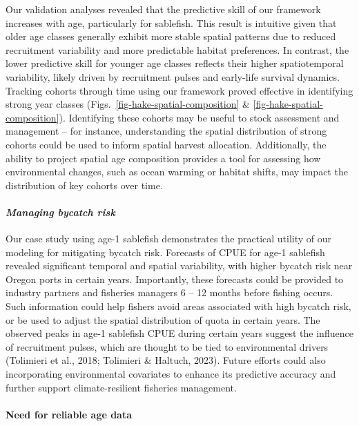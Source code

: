 \documentclass[
]{article}
\let\oldparagraph\paragraph
\renewcommand{\paragraph}[1]{\oldparagraph{#1}\mbox{}}
\begin{document}
Our validation analyses revealed that the predictive skill of our
framework increases with age, particularly for sablefish. This result is
intuitive given that older age classes generally exhibit more stable
spatial patterns due to reduced recruitment variability and more
predictable habitat preferences. In contrast, the lower predictive skill
for younger age classes reflects their higher spatiotemporal
variability, likely driven by recruitment pulses and early-life survival
dynamics. Tracking cohorts through time using our framework proved
effective in identifying strong year classes
(Figs.~\ref{fig-hake-spatial-composition} \&
\ref{fig-hake-spatial-composition}). Identifying these cohorts may be
useful to stock assessment and management -- for instance, understanding
the spatial distribution of strong cohorts could be used to inform
spatial harvest allocation. Additionally, the ability to project spatial
age composition provides a tool for assessing how environmental changes,
such as ocean warming or habitat shifts, may impact the distribution of
key cohorts over time.

\hypertarget{managing-bycatch-risk}{%
\paragraph{\texorpdfstring{\emph{Managing bycatch
risk}}{Managing bycatch risk}}\label{managing-bycatch-risk}}

Our case study using age-1 sablefish demonstrates the practical utility
of our modeling for mitigating bycatch risk. Forecasts of CPUE for age-1
sablefish revealed significant temporal and spatial variability, with
higher bycatch risk near Oregon ports in certain years. Importantly,
these forecasts could be provided to industry partners and fisheries
managers 6 -- 12 months before fishing occurs. Such information could
help fishers avoid areas associated with high bycatch risk, or be used
to adjust the spatial distribution of quota in certain years. The
observed peaks in age-1 sablefish CPUE during certain years suggest the
influence of recruitment pulses, which are thought to be tied to
environmental drivers (Tolimieri et al., 2018; Tolimieri \& Haltuch,
2023). Future efforts could also incorporating environmental covariates
to enhance its predictive accuracy and further support climate-resilient
fisheries management.

\hypertarget{need-for-reliable-age-data}{%
\paragraph{Need for reliable age
data}\label{need-for-reliable-age-data}}
\end{document}
